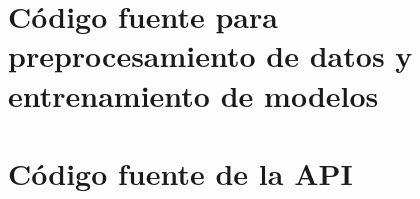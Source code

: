 \documentclass[12pt, a4paper, titlepage]{report} %
\begin{document}
\renewcommand*\appendixpagename{{\textcolor{azulescom}{Anexos}}}
\renewcommand*\appendixtocname{{\textcolor{azulescom}{Anexos}}}
\pagebreak
\appendixpageon
\begin{appendices}
  \newpage
  \section{Código fuente para preprocesamiento de datos y entrenamiento de modelos}
  

  \newpage
  \section{Código fuente de la API}
  

	\newpage
	\renewcommand*\glossaryname{{\textcolor{azulescom}{Glosario}}}
	\printglossary

	\newpage
	\renewcommand*\glossaryname{{\textcolor{azulescom}{Acrónimos}}}
	\printglossary[title={\textcolor{azulescom}{Acrónimos}}, type=\acronymtype]

\end{appendices}




\end{document}
